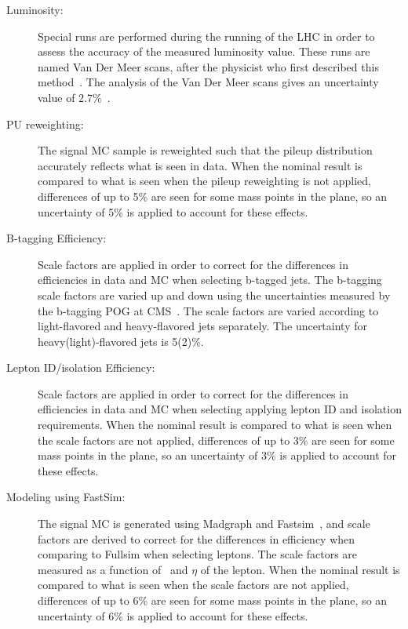 \begin{description}

\item[Luminosity:] 
  Special runs are performed during the running of the LHC in order to assess the accuracy of the measured luminosity value.
  These runs are named Van Der Meer scans, after the physicist who first described this method~\cite{vdm}.
  The analysis of the Van Der Meer scans gives an uncertainty value of 2.7\%~\cite{lumi15up}.

\item[PU reweighting:] 
  The signal MC sample is reweighted such that the pileup distribution accurately reflects what is seen in data.
  When the nominal result is compared to what is seen when the pileup reweighting is not applied,
  differences of up to 5\% are seen for some mass points in the plane, so an uncertainty of 5\% is applied to account for these effects. 

\item[B-tagging Efficiency:] 
  Scale factors are applied in order to correct for the differences in efficiencies in data and MC when selecting b-tagged jets.
  The b-tagging scale factors are varied up and down using the uncertainties measured by the b-tagging POG at CMS~\cite{beff_2015}.  
  The scale factors are varied according to light-flavored and heavy-flavored jets separately. The uncertainty for heavy(light)-flavored jets is 5(2)\%.  

\item[Lepton ID/isolation Efficiency:] 
  Scale factors are applied in order to correct for the differences in efficiencies in data and MC when selecting applying lepton ID and isolation requirements.
  When the nominal result is compared to what is seen when the scale factors are not applied,
  differences of up to 3\% are seen for some mass points in the plane, so an uncertainty of 3\% is applied to account for these effects. 
  
\item[Modeling using FastSim:] 
  The signal MC is generated using Madgraph and Fastsim~\cite{fastsim},
  and scale factors are derived to correct for the differences in efficiency when comparing to Fullsim when selecting leptons.
  The scale factors are measured as a function of \pt\ and $\eta$ of the lepton.
  When the nominal result is compared to what is seen when the scale factors are not applied,
  differences of up to 6\% are seen for some mass points in the plane, so an uncertainty of 6\% is applied to account for these effects. 


\end{description}
